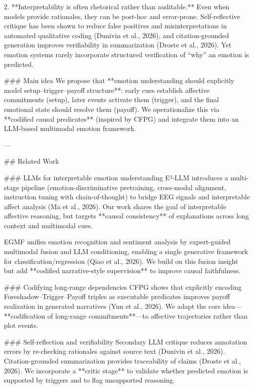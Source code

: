 2. **Interpretability is often rhetorical rather than auditable.** Even when models provide rationales, they can be post-hoc and error-prone. Self-reflective critique has been shown to reduce false positives and misinterpretations in automated qualitative coding (Dunivin et al., 2026), and citation-grounded generation improves verifiability in summarization (Droste et al., 2026). Yet emotion systems rarely incorporate structured verification of “why” an emotion is predicted.

### Main idea  
We propose that **emotion understanding should explicitly model setup–trigger–payoff structure**: early cues establish affective commitments (setup), later events activate them (trigger), and the final emotional state should resolve them (payoff). We operationalize this via **codified causal predicates** (inspired by CFPG) and integrate them into an LLM-based multimodal emotion framework.

---

## Related Work  

### LLMs for interpretable emotion understanding  
E²-LLM introduces a multi-stage pipeline (emotion-discriminative pretraining, cross-modal alignment, instruction tuning with chain-of-thought) to bridge EEG signals and interpretable affect analysis (Ma et al., 2026). Our work shares the goal of interpretable affective reasoning, but targets **causal consistency** of explanations across long context and multimodal cues.

EGMF unifies emotion recognition and sentiment analysis by expert-guided multimodal fusion and LLM conditioning, enabling a single generative framework for classification/regression (Qiao et al., 2026). We build on this fusion insight but add **codified narrative-style supervision** to improve causal faithfulness.

### Codifying long-range dependencies  
CFPG shows that explicitly encoding Foreshadow–Trigger–Payoff triples as executable predicates improves payoff realization in generated narratives (Yun et al., 2026). We adapt the core idea—**codification of long-range commitments**—to affective trajectories rather than plot events.

### Self-reflection and verifiability  
Secondary LLM critique reduces annotation errors by re-checking rationales against source text (Dunivin et al., 2026). Citation-grounded summarization provides traceability of claims (Droste et al., 2026). We incorporate a **critic stage** to validate whether predicted emotion is supported by triggers and to flag unsupported reasoning.

